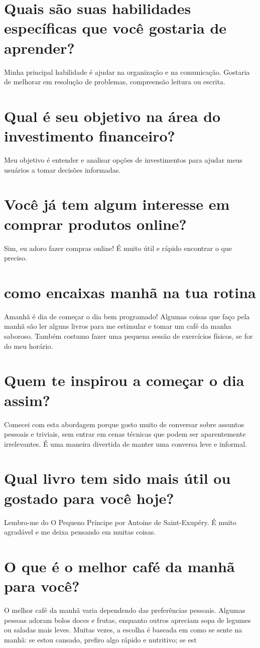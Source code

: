 \documentclass[11pt,a4paper]{article}
\begin{document}
\section{Quais são suas habilidades específicas que você gostaria de aprender?}
Minha principal habilidade é ajudar na organização e na comunicação. Gostaria de melhorar em resolução de problemas, compreensão leitura ou escrita.

\section{Qual é seu objetivo na área do investimento financeiro?}
Meu objetivo é entender e analisar opções de investimentos para ajudar meus usuários a tomar decisões informadas.

\section{Você já tem algum interesse em comprar produtos online?}
Sim, eu adoro fazer compras online! É muito útil e rápido encontrar o que preciso.

\section{como encaixas manhã na tua rotina}
Amanhã é dia de começar o dia bem programado! Algumas coisas que faço pela manhã são ler alguns livros para me estimular e tomar um café da manha saboroso. Também costumo fazer uma pequena sessão de exercícios físicos, se for do meu horário.

\section{Quem te inspirou a começar o dia assim?}
Comecei com esta abordagem porque gosto muito de conversar sobre assuntos pessoais e triviais, sem entrar em cenas técnicas que podem ser aparentemente irrelevantes. É uma maneira divertida de manter uma conversa leve e informal.

\section{Qual livro tem sido mais útil ou gostado para você hoje?}
Lembro-me do O Pequeno Príncipe por Antoine de Saint-Exupéry. É muito agradável e me deixa pensando em muitas coisas.

\section{O que é o melhor café da manhã para você?}
O melhor café da manhã varia dependendo das preferências pessoais. Algumas pessoas adoram bolos doces e frutas, enquanto outros apreciam sopa de legumes ou saladas mais leves. Muitas vezes, a escolha é baseada em como se sente na manhã: se estou cansado, prefiro algo rápido e nutritivo; se est
\end{document}
